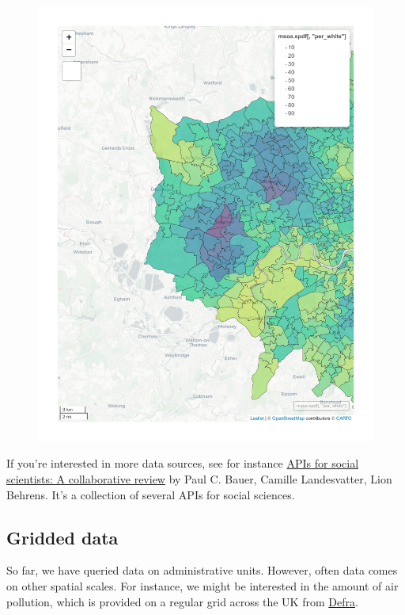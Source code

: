 \documentclass[
  letterpaper,
  DIV=11,
  numbers=noendperiod]{scrreprt}
\begin{document}
\begin{figure}[H]

{\centering \includegraphics{01_refresher_files/figure-pdf/unnamed-chunk-12-1.pdf}

}

\end{figure}

If you're interested in more data sources, see for instance
\href{https://bookdown.org/paul/apis_for_social_scientists/}{APIs for
social scientists: A collaborative review} by Paul C. Bauer, Camille
Landesvatter, Lion Behrens. It's a collection of several APIs for social
sciences.

\hypertarget{gridded-data}{%
\subsection{Gridded data}\label{gridded-data}}

So far, we have queried data on administrative units. However, often
data comes on other spatial scales. For instance, we might be interested
in the amount of air pollution, which is provided on a regular grid
across the UK from
\href{https://uk-air.defra.gov.uk/data/pcm-data}{Defra}.
\end{document}
